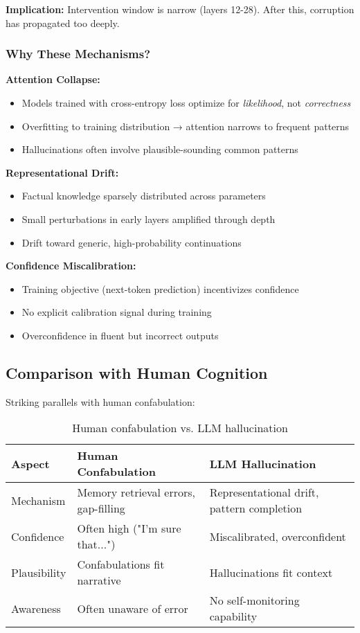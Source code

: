 \documentclass[11pt]{article}
\begin{document}
\textbf{Implication:} Intervention window is narrow (layers 12-28). After this, corruption has propagated too deeply.

\subsubsection{Why These Mechanisms?}

\textbf{Attention Collapse:}
\begin{itemize}
    \item Models trained with cross-entropy loss optimize for \textit{likelihood}, not \textit{correctness}
    \item Overfitting to training distribution → attention narrows to frequent patterns
    \item Hallucinations often involve plausible-sounding common patterns
\end{itemize}

\textbf{Representational Drift:}
\begin{itemize}
    \item Factual knowledge sparsely distributed across parameters
    \item Small perturbations in early layers amplified through depth
    \item Drift toward generic, high-probability continuations
\end{itemize}

\textbf{Confidence Miscalibration:}
\begin{itemize}
    \item Training objective (next-token prediction) incentivizes confidence
    \item No explicit calibration signal during training
    \item Overconfidence in fluent but incorrect outputs
\end{itemize}

\subsection{Comparison with Human Cognition}

Striking parallels with human confabulation:

\begin{table}[H]
\centering
\begin{tabular}{@{}p{4cm}p{4cm}p{4cm}@{}}
\toprule
\textbf{Aspect} & \textbf{Human Confabulation} & \textbf{LLM Hallucination} \\ \midrule
Mechanism & Memory retrieval errors, gap-filling & Representational drift, pattern completion \\
Confidence & Often high ("I'm sure that...") & Miscalibrated, overconfident \\
Plausibility & Confabulations fit narrative & Hallucinations fit context \\
Awareness & Often unaware of error & No self-monitoring capability \\ \bottomrule
\end{tabular}
\caption{Human confabulation vs. LLM hallucination}
\end{table}
\end{document}
